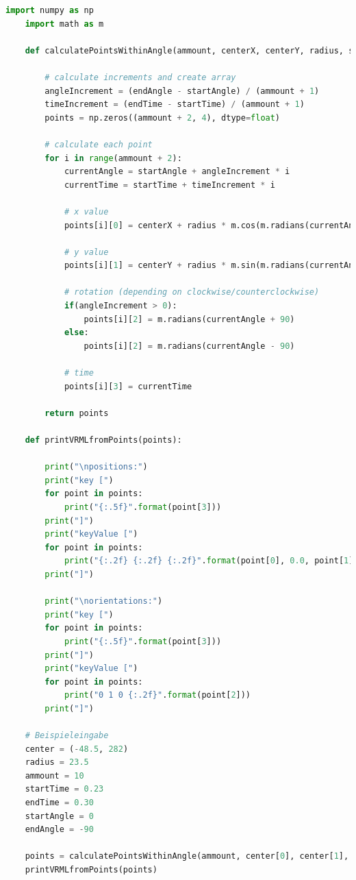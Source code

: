 \documentclass{article}
\begin{document}
\begin{lstlisting}[language=Python]
    import numpy as np
    import math as m
    
    def calculatePointsWithinAngle(ammount, centerX, centerY, radius, startTime, endTime, startAngle, endAngle):
    
        # calculate increments and create array
        angleIncrement = (endAngle - startAngle) / (ammount + 1)
        timeIncrement = (endTime - startTime) / (ammount + 1)
        points = np.zeros((ammount + 2, 4), dtype=float)
    
        # calculate each point
        for i in range(ammount + 2):
            currentAngle = startAngle + angleIncrement * i
            currentTime = startTime + timeIncrement * i
            
            # x value
            points[i][0] = centerX + radius * m.cos(m.radians(currentAngle))
    
            # y value
            points[i][1] = centerY + radius * m.sin(m.radians(currentAngle))
            
            # rotation (depending on clockwise/counterclockwise)
            if(angleIncrement > 0):
                points[i][2] = m.radians(currentAngle + 90)
            else:
                points[i][2] = m.radians(currentAngle - 90)
    
            # time
            points[i][3] = currentTime
    
        return points
    
    def printVRMLfromPoints(points):
    
        print("\npositions:")
        print("key [")
        for point in points:
            print("{:.5f}".format(point[3]))
        print("]")
        print("keyValue [")
        for point in points:
            print("{:.2f} {:.2f} {:.2f}".format(point[0], 0.0, point[1]))
        print("]")
    
        print("\norientations:")
        print("key [")
        for point in points:
            print("{:.5f}".format(point[3]))
        print("]")
        print("keyValue [")
        for point in points:
            print("0 1 0 {:.2f}".format(point[2]))
        print("]")

    # Beispieleingabe
    center = (-48.5, 282)
    radius = 23.5
    ammount = 10
    startTime = 0.23
    endTime = 0.30
    startAngle = 0
    endAngle = -90
    
    points = calculatePointsWithinAngle(ammount, center[0], center[1], radius, startTime, endTime, startAngle, endAngle)
    printVRMLfromPoints(points)
\end{lstlisting}
\end{document}
